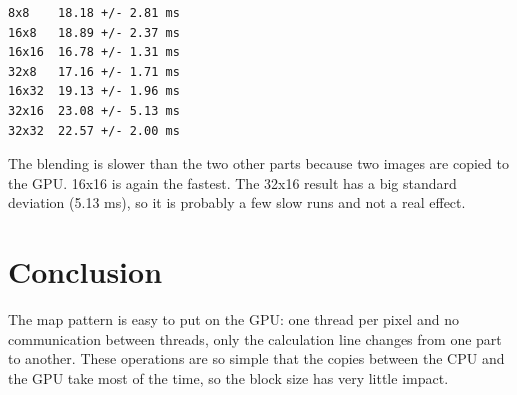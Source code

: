 \documentclass{report}
\begin{document}
\begin{verbatim}
8x8    18.18 +/- 2.81 ms
16x8   18.89 +/- 2.37 ms
16x16  16.78 +/- 1.31 ms
32x8   17.16 +/- 1.71 ms
16x32  19.13 +/- 1.96 ms
32x16  23.08 +/- 5.13 ms
32x32  22.57 +/- 2.00 ms
\end{verbatim}

The blending is slower than the two other parts because two images are copied to the GPU. 16x16 is again the fastest. The 32x16 result has a big standard deviation (5.13 ms), so it is probably a few slow runs and not a real effect.

\section*{Conclusion}

The map pattern is easy to put on the GPU: one thread per pixel and no communication between threads, only the calculation line changes from one part to another. These operations are so simple that the copies between the CPU and the GPU take most of the time, so the block size has very little impact.
\end{document}
